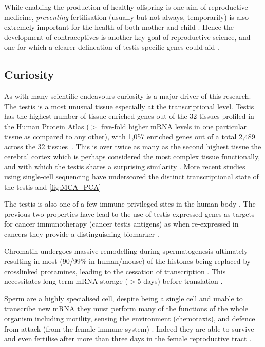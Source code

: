 While enabling the production of healthy offspring is one aim of reproductive medicine, \emph{preventing} fertilisation (usually but not always, temporarily) is also extremely important for the health of both mother and child \parencite{Cleland2012Contraception}. Hence the development of contraceptives is another key goal of reproductive science, and one for which a clearer delineation of testis specific genes could aid \parencite{Schultz2003multitude}.


\subsection{Curiosity}
As with many scientific endeavours curiosity is a major driver of this research. The testis is a most unusual tissue especially at the transcriptional level. Testis has the highest number of tissue enriched genes out of the 32 tissues profiled in the Human Protein Atlas ($>$ five-fold higher mRNA levels in one particular tissue as compared to any other), with 1,057 enriched genes out of a total 2,489 across the 32 tissues~\cite{Djureinovic2014human,Mele2015Human, Uhlen2015Tissuebased, Uhlen2016Transcriptomics, Atlashuman}. This is over twice as many as the second highest tissue the cerebral cortex which is perhaps considered the most complex tissue functionally, and with which the testis shares a surprising similarity \parencite{Guo2005Transcriptomic, Djureinovic2014human, Uhlen2015Tissuebased}. More recent studies using single-cell sequencing have underscored the distinct transcriptional state of the testis \parencite{Han2018Mapping} and \ref{fig:MCA_PCA}

The testis is also one of a few immune privileged sites in the human body \parencite{Fijak2006testis}. The previous two properties have lead to the use of testis expressed genes as targets for cancer immunotherapy (cancer testis antigens) as when re-expressed in cancers they provide a distinguishing biomarker \parencite{Whitehurst2014Cause}.

Chromatin undergoes massive remodelling during spermatogenesis ultimately resulting in most (90/99\% in human/mouse) of the histones being replaced by crosslinked protamines, leading to the cessation of transcription \parencite{Rathke2014Chromatin}. This necessitates long term mRNA storage ($>$5 days) before translation \parencite{}.

Sperm are a highly specialised cell, despite being a single cell and unable to transcribe new mRNA they must perform many of the functions of the whole organism including motility, sensing the environment (chemotaxis), and defence from attack (from the female immune system) \parencite{Kaupp2008Mechanisms, Thompson1992Leukocytic}. Indeed they are able to survive and even fertilise after more than three days in the female reproductive tract \parencite{Gould1984Assessment,Wilcox1995Timing}.

